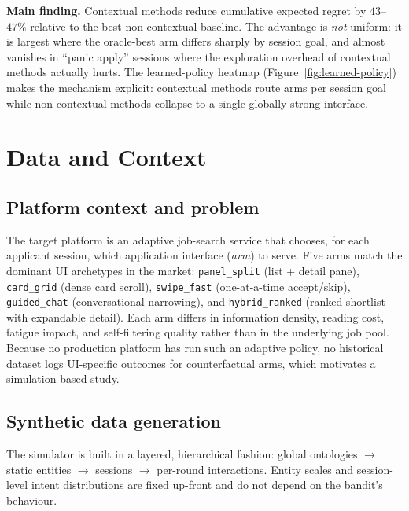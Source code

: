 \documentclass[11pt,a4paper]{article}
\begin{document}
\textbf{Main finding.} Contextual methods reduce cumulative expected regret by
$43$--$47\%$ relative to the best non-contextual baseline. The advantage is
\emph{not} uniform: it is largest where the oracle-best arm differs sharply by
session goal, and almost vanishes in ``panic apply'' sessions where the
exploration overhead of contextual methods actually hurts. The learned-policy
heatmap (Figure~\ref{fig:learned-policy}) makes the mechanism explicit:
contextual methods route arms per session goal while non-contextual methods
collapse to a single globally strong interface.

\section{Data and Context}

\subsection{Platform context and problem}

The target platform is an adaptive job-search service that chooses, for each
applicant session, which application interface (\emph{arm}) to serve. Five arms
match the dominant UI archetypes in the market: \texttt{panel\_split} (list +
detail pane), \texttt{card\_grid} (dense card scroll), \texttt{swipe\_fast}
(one-at-a-time accept/skip), \texttt{guided\_chat} (conversational narrowing),
and \texttt{hybrid\_ranked} (ranked shortlist with expandable detail). Each arm
differs in information density, reading cost, fatigue impact, and self-filtering
quality rather than in the underlying job pool. Because no production platform
has run such an adaptive policy, no historical dataset logs UI-specific
outcomes for counterfactual arms, which motivates a simulation-based study.

\subsection{Synthetic data generation}

The simulator is built in a layered, hierarchical fashion: global ontologies
$\rightarrow$ static entities $\rightarrow$ sessions $\rightarrow$ per-round
interactions. Entity scales and session-level intent distributions are fixed
up-front and do not depend on the bandit's behaviour.
\end{document}
